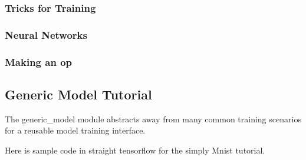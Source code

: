 \documentclass[letterpaper,10pt,english]{sphinxmanual}
\begin{document}
{\hyperref[node_ops:node_ops.binary_tensor_combine]{\emph{}}}

{\hyperref[node_ops:node_ops.ternary_tensor_combine]{\emph{}}}


\subsubsection{Tricks for Training}
\label{node_ops_tutorial:tricks-for-training}
{\hyperref[node_ops:node_ops.batch_normalize]{\emph{}}}

{\hyperref[node_ops:node_ops.dropout]{\emph{}}}


\subsubsection{Neural Networks}
\label{node_ops_tutorial:neural-networks}





\subsubsection{Making an op}
\label{node_ops_tutorial:making-an-op}

\subsection{Generic Model Tutorial}
\label{generic_model_tutorial:generic-model-tutorial}\label{generic_model_tutorial::doc}
The generic\_model module abstracts away from many common training scenarios for a reusable model training interface.

Here is sample code in straight tensorflow for the simply Mnist tutorial.
\end{document}
